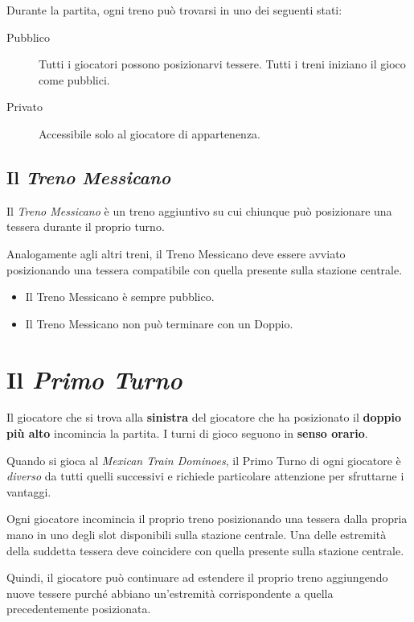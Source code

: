 \documentclass[sigconf,10pt]{acmart}
\begin{document}
Durante la partita, ogni treno può trovarsi in uno dei seguenti stati:

\begin{description}
\item[Pubblico] Tutti i giocatori possono posizionarvi tessere. Tutti i treni iniziano il gioco come pubblici.
\item[Privato] Accessibile solo al giocatore di appartenenza.
\end{description}

\subsection{Il \textit{Treno Messicano}}

Il \textit{Treno Messicano} è un treno aggiuntivo su cui chiunque può posizionare una tessera durante il proprio turno. 

Analogamente agli altri treni, il Treno Messicano deve essere avviato posizionando una tessera compatibile con quella presente sulla stazione centrale. 

\begin{itemize}
\item Il Treno Messicano è sempre pubblico.

\item Il Treno Messicano non può terminare con un Doppio.
\end{itemize}

\section{Il \textit{Primo Turno}}

Il giocatore che si trova alla \textbf{sinistra} del giocatore che ha posizionato il \textbf{doppio più alto} incomincia la partita. I turni di gioco seguono in \textbf{senso orario}.

Quando si gioca al \textit{Mexican Train Dominoes}, il Primo Turno di ogni giocatore è \textit{diverso} da tutti quelli successivi e richiede particolare attenzione per sfruttarne i vantaggi.

Ogni giocatore incomincia il proprio treno posizionando una tessera dalla propria mano in uno degli slot disponibili sulla stazione centrale. Una delle estremità della suddetta tessera deve coincidere con quella presente sulla stazione centrale. 

Quindi, il giocatore può continuare ad estendere il proprio treno aggiungendo nuove tessere purché abbiano un'estremità corrispondente a quella precedentemente posizionata.
\end{document}
